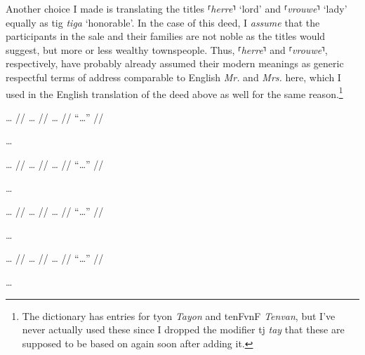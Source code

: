 \documentclass[12pt,paper=a4]{scrartcl}
\newcommand{\fw}[1]{\textit{#1}} %
\newcommand{\norm}[1]{⸢\textit{#1}⸣} %
\newcommand{\ayr}[1]{{\Tagati #1}}
\newcommand{\xayr}[3]{{\Tagati #1} \emph{#2} \enquote*{#3}}
\begin{document}
Another choice I made is translating the titles \norm{herre} `lord' and 
\norm{vrouwe} `lady' equally as \xayr{tig}{tiga} {honorable}. In the case of 
this deed, I \emph{assume} that the participants in the sale and their families 
are not noble as the titles would suggest, but more or less wealthy townspeople. 
Thus, \norm{herre} and \norm{vrouwe}, respectively, have probably already 
assumed their modern meanings as generic respectful terms of address comparable 
to English \fw{Mr.} and \fw{Mrs.} here, which I used in the English translation 
of the deed above as well for the same reason.\footnote{The dictionary has 
entries for \ayr{tyon} \fw{Tayon} and \ayr{tenFvnF} \fw{Tenvan}, but I've never 
actually used these since I dropped the modifier \ayr{tj} \fw{tay} that these 
are supposed to be based on again soon after adding it.}


\ex \begingl
	\glpreamble … //
	\gla … //
	\glb … //
	\glft \enquote{…} //
\endgl \xe

…


\ex \begingl
	\glpreamble … //
	\gla … //
	\glb … //
	\glft \enquote{…} //
\endgl \xe

…


\ex \begingl
	\glpreamble … //
	\gla … //
	\glb … //
	\glft \enquote{…} //
\endgl \xe

…


\ex \begingl
	\glpreamble … //
	\gla … //
	\glb … //
	\glft \enquote{…} //
\endgl \xe

…

\end{document}

